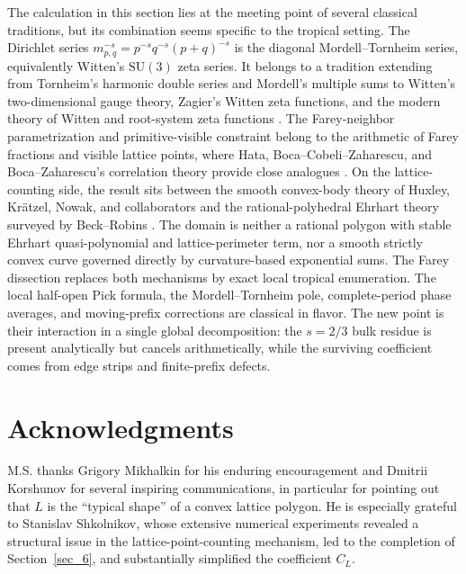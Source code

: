 \documentclass[a4paper,american,11pt]{amsart}
\theoremstyle{plain}
\theoremstyle{definition}
\begin{document}
The calculation in this section lies at the meeting point of several classical
traditions, but its combination seems specific to the tropical setting.  The
Dirichlet series \(m_{p,q}^{-s}=p^{-s}q^{-s}(p+q)^{-s}\) is the diagonal
Mordell--Tornheim series, equivalently Witten's \(\mathrm{SU}(3)\) zeta series.
It belongs to a tradition extending from Tornheim's harmonic double series and
Mordell's multiple sums to Witten's two-dimensional gauge theory, Zagier's
Witten zeta functions, and the modern theory of Witten and root-system zeta
functions
\cite{Tornheim1950,Mordell1958,Witten1991QuantumGauge2D,Zagier1994ValuesZeta,MatsumotoTsumura2006,Komori2008MordellTornheim}.
The Farey-neighbor parametrization and primitive-visible constraint belong to
the arithmetic of Farey fractions and visible lattice points, where Hata,
Boca--Cobeli--Zaharescu, and Boca--Zaharescu's correlation theory provide close
analogues \cite{Hata1995Farey,BocaCobeliZaharescu2000,BocaZaharescu2005}.  On
the lattice-counting side, the result sits between the smooth convex-body
theory of Huxley, Kr\"atzel, Nowak, and collaborators
\cite{HuxleyNowak1996,KratzelNowak1992,Huxley2000,IvicKratzelKuehleitnerNowak2004}
and the rational-polyhedral Ehrhart theory surveyed by Beck--Robins
\cite{BeckRobins2015}.  The domain is neither a rational polygon with stable
Ehrhart quasi-polynomial and lattice-perimeter term, nor a smooth strictly
convex curve governed directly by curvature-based exponential sums.  The Farey
dissection replaces both mechanisms by exact local tropical enumeration.  The
local half-open Pick formula, the Mordell--Tornheim pole, complete-period phase
averages, and moving-prefix corrections are classical in flavor. The new point
is their interaction in a single global decomposition: the \(s=2/3\) bulk
residue is present analytically but cancels arithmetically, while the surviving
coefficient comes from edge strips and finite-prefix defects.

\section*{Acknowledgments}
M.S. thanks Grigory Mikhalkin for his enduring encouragement and Dmitrii Korshunov for several inspiring communications, in particular for pointing out that \(L\) is the ``typical shape'' of a convex lattice polygon. He is especially grateful to Stanislav Shkolnikov, whose extensive numerical experiments revealed a structural issue in the lattice-point-counting mechanism, led to the completion of Section~\ref{sec_6}, and substantially simplified the coefficient \(C_L\).
\end{document}
